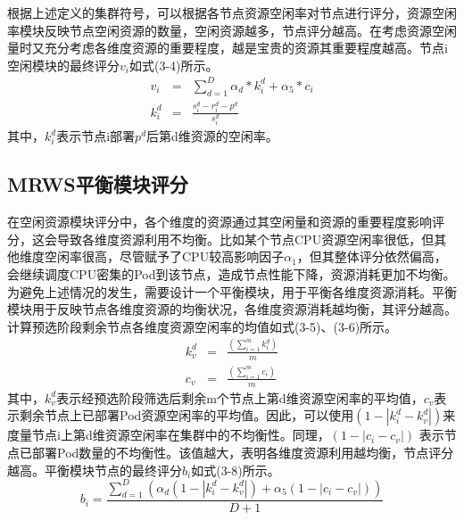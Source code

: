 根据上述定义的集群符号，可以根据各节点资源空闲率对节点进行评分，资源空闲率模块反映节点空闲资源的数量，空闲资源越多，节点评分越高。在考虑资源空闲量时又充分考虑各维度资源的重要程度，越是宝贵的资源其重要程度越高。节点i空闲模块的最终评分$v_{i}$如式(3-4)所示。
\begin{eqnarray}
v_{i} & = & \sum_{d=1}^{D}\alpha_{d}*k_{i}^{d}+\alpha_{5}*c_{i} \\[0.3cm]
k_{i}^{d} & = & \frac{s_{i}^{d}-r_{i}^{d}-p^{d}}{s_{i}^{d}}
\end{eqnarray}
其中，$k_{i}^{d}$表示节点i部署$p^{d}$后第d维资源的空闲率。

\subsection{MRWS平衡模块评分}
在空闲资源模块评分中，各个维度的资源通过其空闲量和资源的重要程度影响评分，这会导致各维度资源利用不均衡。比如某个节点CPU资源空闲率很低，但其他维度空闲率很高，尽管赋予了CPU较高影响因子\begin{math}\alpha_{1}\end{math}，但其整体评分依然偏高，会继续调度CPU密集的Pod到该节点，造成节点性能下降，资源消耗更加不均衡。为避免上述情况的发生，需要设计一个平衡模块，用于平衡各维度资源消耗。平衡模块用于反映节点各维度资源的均衡状况，各维度资源消耗越均衡，其评分越高。计算预选阶段剩余节点各维度资源空闲率的均值如式(3-5)、(3-6)所示。
\begin{eqnarray}
k_{v}^{d} &=& \frac{(\sum_{i=1}^{m}k_{i}^{d})}{m} \\[0.3cm]
c_{v} &=& \frac{(\sum_{i=1}^{m}c_{i})}{m}
\end{eqnarray}
其中，\begin{math}k_{v}^{d}\end{math}表示经预选阶段筛选后剩余m个节点上第d维资源空闲率的平均值，\begin{math}c_{v}\end{math}表示剩余节点上已部署Pod资源空闲率的平均值。因此，可以使用\begin{math}(1-\left |k_{i}^{d}-k_{v}^{d}\right |)\end{math}来度量节点i上第d维资源空闲率在集群中的不均衡性。同理，\begin{math}(1-\left |c_{i}-c_{v}\right|)\end{math}
表示节点已部署Pod数量的不均衡性。该值越大，表明各维度资源利用越均衡，节点评分越高。平衡模块节点的最终评分\begin{math}b_{i}\end{math}如式(3-8)所示。
\begin{equation}
b_{i} = \frac{\sum_{d=1}^{D}(\alpha_{d}(1-\left |k_{i}^{d}-k_{v}^{d}\right|)+\alpha_{5}(1-\left |c_{i}-c_{v}\right|))}{D+1}
\end{equation}

